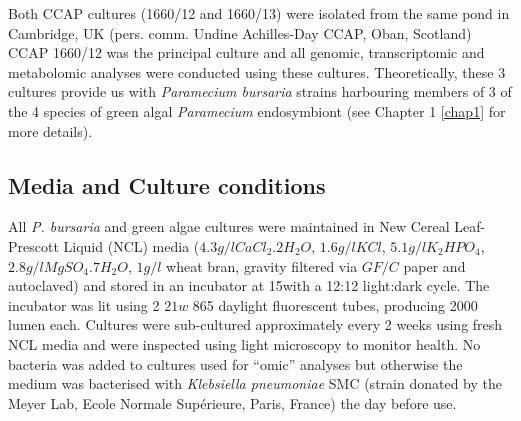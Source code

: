 Both CCAP cultures (1660/12 and 1660/13) were isolated from the same pond in Cambridge, UK (pers. comm. Undine Achilles-Day CCAP, Oban, Scotland)
CCAP 1660/12 was the principal culture and all genomic, transcriptomic and metabolomic analyses were conducted using these cultures. 
Theoretically, these 3 cultures provide us with \textit{Paramecium bursaria} strains harbouring members of 3 of the 4 species of 
green algal \textit{Paramecium} endosymbiont (see Chapter 1 \ref{chap1} for more details).

\subsection{Media and Culture conditions}
All \textit{P. bursaria} and green algae cultures were maintained in 
New Cereal Leaf-Prescott Liquid (NCL) media 
(\(4.3g/l CaCl_{2}.2H_{2}O\), \(1.6g/l KCl\), \(5.1g/l K_{2}HPO_{4}\), \(2.8g/l MgSO_{4}.7H_{2}O\), 
\(1g/l\) wheat bran, gravity filtered via \(GF/C\) paper and autoclaved) \citep{NCLCCAP} and stored in 
an incubator at 15\celsius with a 12:12 light:dark cycle.  The incubator was
lit using 2 \(21w\) 865 daylight fluorescent tubes, producing 2000 lumen each.
Cultures were sub-cultured approximately every 2 weeks using fresh NCL media and were inspected using light microscopy to monitor health.  
No bacteria was added to cultures used for ``omic'' analyses but otherwise the medium was bacterised with
\textit{Klebsiella pneumoniae} SMC (strain donated by the Meyer Lab, Ecole Normale Supérieure, Paris, France) the day before use. 


